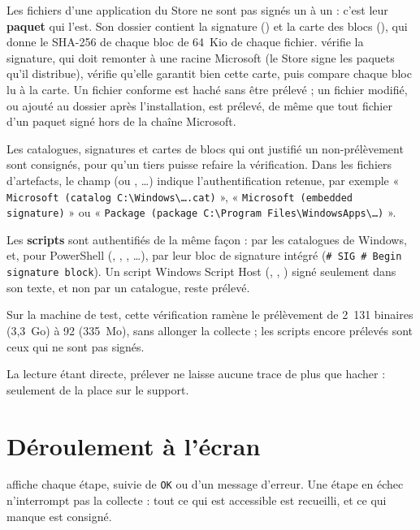\documentclass[11pt,a4paper,oneside]{report}
\begin{document}
Les fichiers d'une application du Store ne sont pas signés un à un : c'est leur
\textbf{paquet} qui l'est. Son dossier contient la signature
() et la carte des blocs (),
qui donne le SHA-256 de chaque bloc de 64~Kio de chaque fichier. \wac{} vérifie
la signature, qui doit remonter à une racine Microsoft (le Store signe les
paquets qu'il distribue), vérifie qu'elle garantit bien cette carte, puis compare
chaque bloc lu à la carte. Un fichier conforme est haché sans être prélevé ; un
fichier modifié, ou ajouté au dossier après l'installation, est prélevé, de même
que tout fichier d'un paquet signé hors de la chaîne Microsoft.

Les catalogues, signatures et cartes de blocs qui ont justifié un
non-prélèvement sont consignés, pour qu'un tiers puisse refaire la vérification.
Dans les fichiers d'artefacts, le champ  (ou
, \ldots) indique
l'authentification retenue, par exemple
« \texttt{Microsoft (catalog C:\textbackslash{}Windows\textbackslash{}\ldots.cat)} »,
« \texttt{Microsoft (embedded signature)} » ou
« \texttt{Package (package C:\textbackslash{}Program Files\textbackslash{}WindowsApps\textbackslash{}\ldots)} ».

Les \textbf{scripts} sont authentifiés de la même façon : par les catalogues de
Windows, et, pour PowerShell (, , ,
\ldots), par leur bloc de signature intégré
(\texttt{\# SIG \# Begin signature block}). Un script Windows Script Host
(, , ) signé seulement dans son texte, et
non par un catalogue, reste prélevé.

Sur la machine de test, cette vérification ramène le prélèvement de 2~131
binaires (3,3~Go) à 92 (335~Mo), sans allonger la collecte ; les scripts encore
prélevés sont ceux qui ne sont pas signés.

La lecture étant directe, prélever ne laisse aucune trace de plus que hacher :
seulement de la place sur le support.

\section{Déroulement à l'écran}

\wac{} affiche chaque étape, suivie de \texttt{OK} ou d'un message d'erreur. Une
étape en échec n'interrompt pas la collecte : tout ce qui est accessible est
recueilli, et ce qui manque est consigné.
\end{document}
